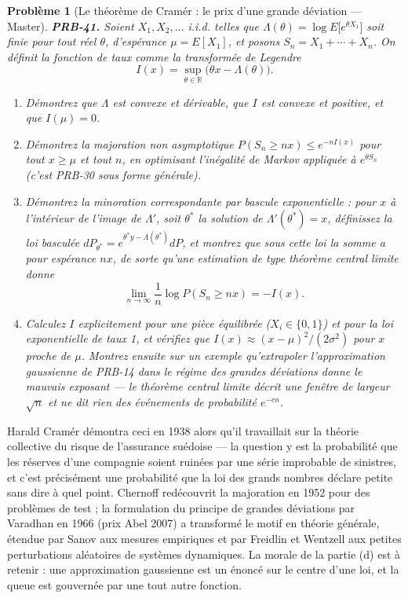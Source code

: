 \documentclass[11pt]{article}
\newtheorem{problem}{Problème}
\begin{document}
\begin{problem}[{Le théorème de Cramér : le prix d'une grande déviation --- Master}]
\textbf{PRB-41.} Soient $ X_1, X_2, \dots $ i.i.d. telles que
$ \Lambda(\theta) = \log E\big[e^{\theta X_1}\big] $ soit finie pour tout réel $ \theta $,
d'espérance $ \mu = E[X_1] $, et posons $ S_n = X_1 + \cdots + X_n $. On définit la fonction de
taux comme la transformée de Legendre
\[ I(x) = \sup_{\theta \in \mathbb{R}} \big( \theta x - \Lambda(\theta) \big) . \]
\begin{enumerate}
\item[(a)] Démontrez que $ \Lambda $ est convexe et dérivable, que $ I $ est convexe et positive, et
que $ I(\mu) = 0 $.
\item[(b)] Démontrez la majoration non asymptotique $ P(S_n \ge nx) \le e^{-n I(x)} $ pour tout
$ x \ge \mu $ et tout $ n $, en optimisant l'inégalité de Markov appliquée à
$ e^{\theta S_n} $ (c'est PRB-30 sous forme générale).
\item[(c)] Démontrez la minoration correspondante par bascule exponentielle : pour $ x $ à l'intérieur
de l'image de $ \Lambda' $, soit $ \theta^{*} $ la solution de
$ \Lambda'(\theta^{*}) = x $, définissez la loi basculée
$ dP_{\theta^{*}} = e^{\theta^{*} y - \Lambda(\theta^{*})} dP $, et montrez que sous cette loi la
somme a pour espérance $ nx $, de sorte qu'une estimation de type théorème central limite donne
\[ \lim_{n \to \infty} \frac{1}{n} \log P(S_n \ge nx) = -I(x) . \]
\item[(d)] Calculez $ I $ explicitement pour une pièce équilibrée ($ X_i \in \{0,1\} $) et pour la loi
exponentielle de taux 1, et vérifiez que $ I(x) \approx (x-\mu)^2/(2\sigma^2) $ pour $ x $
proche de $ \mu $. Montrez ensuite sur un exemple qu'extrapoler l'approximation gaussienne de
PRB-14 dans le régime des grandes déviations donne le mauvais exposant --- le théorème central limite
décrit une fenêtre de largeur $ \sqrt{n} $ et ne dit rien des événements de probabilité
$ e^{-cn} $.
\end{enumerate}

\end{problem}

\noindent Harald Cramér démontra ceci en 1938 alors qu'il travaillait sur la théorie
collective du risque de l'assurance suédoise --- la question y est la probabilité que les réserves
d'une compagnie soient ruinées par une série improbable de sinistres, et c'est précisément une
probabilité que la loi des grands nombres déclare petite sans dire à quel point. Chernoff
redécouvrit la majoration en 1952 pour des problèmes de test ; la formulation du principe de
grandes déviations par Varadhan en 1966 (prix Abel 2007) a transformé le motif en théorie générale,
étendue par Sanov aux mesures empiriques et par Freidlin et Wentzell aux petites perturbations
aléatoires de systèmes dynamiques. La morale de la partie (d) est à retenir : une approximation
gaussienne est un énoncé sur le centre d'une loi, et la queue est gouvernée par une tout autre
fonction.
\end{document}
